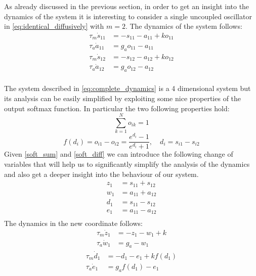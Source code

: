 As already discussed in the previous section, in order to get an insight into the dynamics of the system it is interesting to consider a single uncoupled oscillator in \cref{eq:identical_diffusively}
with $m=2$. The dynamics of the system follows:
\begin{equation}
\begin{aligned}
    \tau_m \dot{s}_{11}&=-s_{11}-a_{11}+ k o_{11} \\
    \tau_a \dot{a}_{11}&=g_a o_{11} - a_{11} \\
    \tau_m \dot{s}_{12}&=-s_{12}-a_{12}+ k o_{12} \\
    \tau_a \dot{a}_{12}&=g_a o_{12} - a_{12} \\
\end{aligned}
\label{eq:complete_dynamics}
\end{equation}

The system described in \eqref{eq:complete_dynamics} is a 4 dimensional system but its analysis can be easily simplified by exploiting some nice properties of the output softmax function. In particular the two following properties hold:  
\begin{equation}
 \sum_{k=1}^{N} o_{i k}=1
 \label{soft_sum}
\end{equation}
\begin{equation}
 f(d_i)= o_{i1}-o_{i2}=\frac{e^{d_i}-1}{e^{d_i}+1}, \quad d_i = s_{i1}-s_{i2}
 \label{soft_diff}
\end{equation}
Given \eqref{soft_sum} and \eqref{soft_diff} we can introduce the following change of variables that will help us to significantly simplify the analysis of the dynamics and also get a deeper insight into the behaviour of our system. 
\begin{equation}
\begin{aligned}
z_1 &= s_{11} + s_{12} \\
w_1 &= a_{11} + a_{12} \\
d_1 &= s_{11} - s_{12} \\
e_1 &= a_{11} - a_{12} \\
\end{aligned}
\end{equation}
The dynamics in the new coordinate follows:
\begin{equation} 
\begin{aligned}
\tau_m \dot z_1 &= - z_1 - w_1 + k\\
\tau_a \dot w_1 &= g_a - w_1
\end{aligned}
\label{eq:sum_dynamics}
\end{equation}
\begin{equation} 
\begin{aligned}
\tau_m \dot d_{1} &= - d_1 - e_1 + k f(d_1) \\
\tau_a \dot{e}_{1} &= g_a f(d_1) - e_{1} \\
\end{aligned}
\label{eq:diff_dynamics}
\end{equation}

